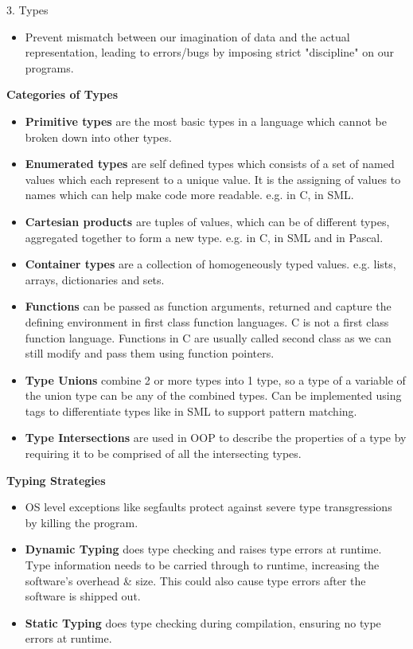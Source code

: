 \begin{center}
     \Large{3. Types}
\end{center}
\begin{itemize}
    \item Prevent mismatch between our imagination of data and the actual representation, leading to errors/bugs by imposing strict "discipline" on our programs.
\end{itemize}
\begin{center}
     \textbf{Categories of Types}
\end{center}
\begin{itemize}
    \item \textbf{Primitive types} are the most basic types in a language which cannot be broken down into other types. 
    \item \textbf{Enumerated types} are self defined types which consists of  a set of  named values which each represent to a unique value. It is the assigning of values to names which can help make code more readable. e.g.  in C,  in SML.
    \item \textbf{Cartesian products} are tuples of values, which can be of different types, aggregated together to form a new type. e.g.  in C,  in SML and  in Pascal.
    \item \textbf{Container types} are a collection of homogeneously typed values. e.g. lists, arrays, dictionaries and sets.
    \item \textbf{Functions} can be passed as function arguments, returned and capture the defining environment in first class function languages. C is not a first class function language. Functions in C are usually called second class as we can still modify and pass them using function pointers.
    \item \textbf{Type Unions} combine 2 or more types into 1 type, so a type of a variable of the union type can be any of the combined types. Can be implemented using tags to differentiate types like in SML to support pattern matching.
    \item \textbf{Type Intersections} are used in OOP to describe the properties of a type by requiring it to be comprised of all the intersecting types. 
\end{itemize}

\begin{center}
     \textbf{Typing Strategies}
\end{center}
\begin{itemize}
    \item OS level exceptions like segfaults protect against severe type transgressions by killing the program. 
    \item \textbf{Dynamic Typing} does type checking and raises type errors at runtime. Type information needs to be carried through to runtime, increasing the software's overhead \& size. This could also cause type errors after the software is shipped out.
    \item \textbf{Static Typing} does type checking during compilation, ensuring no type errors at runtime.
\end{itemize}

